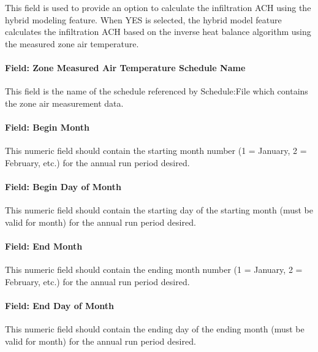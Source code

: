 This field is used to provide an option to calculate the infiltration ACH using the hybrid modeling feature. When YES is selected, the hybrid model feature calculates the infiltration ACH based on the inverse heat balance algorithm using the measured zone air temperature.

\paragraph{Field: Zone Measured Air Temperature Schedule Name}\label{field-zone-measured-air-temperature-schedule-name-hm}

This field is the name of the schedule referenced by Schedule:File which contains the zone air measurement data. 

\paragraph{Field: Begin Month}\label{field-begin-month-hm}

This numeric field should contain the starting month number (1 = January, 2 = February, etc.) for the annual run period desired.

\paragraph{Field: Begin Day of Month}\label{field-begin-day-of-month-hm}

This numeric field should contain the starting day of the starting month (must be valid for month) for the annual run period desired.

\paragraph{Field: End Month}\label{field-end-month-hm}

This numeric field should contain the ending month number (1 = January, 2 = February, etc.) for the annual run period desired.

\paragraph{Field: End Day of Month}\label{field-end-day-of-month-hm}

This numeric field should contain the ending day of the ending month (must be valid for month) for the annual run period desired.

